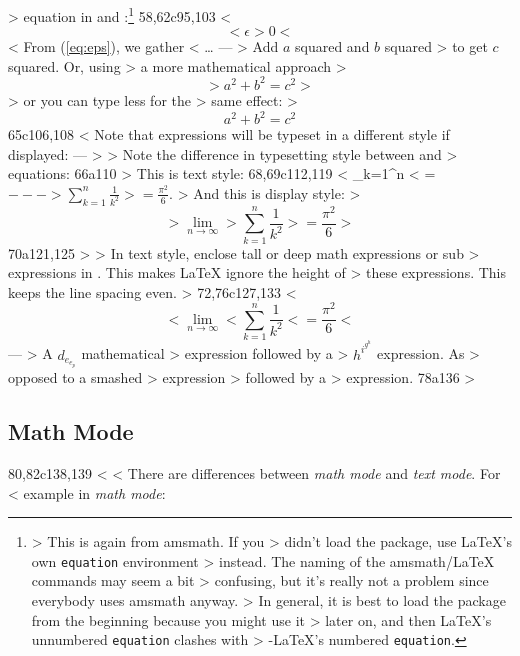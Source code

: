> equation in \ci{[} and \ci{]}:\footnote{
>   This is again from \textsf{amsmath}. If you 
> didn't load the package, use \LaTeX{}'s own \texttt{equation} environment
> instead. The naming of the \textsf{amsmath}/\LaTeX{} commands may seem a bit
> confusing, but it's really not a problem since everybody uses \textsf{amsmath} anyway.
> In general, it is best to load the package from the beginning because you might use it
> later on, and then \LaTeX's unnumbered \texttt{equation} clashes with
> \AmS-\LaTeX's numbered \texttt{equation}.}
58,62c95,103
< \begin{equation} \label{eq:eps}
< \epsilon > 0
< \end{equation}
< From (\ref{eq:eps}), we gather 
< \ldots
---
> Add $a$ squared and $b$ squared
> to get $c$ squared. Or, using
> a more mathematical approach
>  \begin{equation*}
>    a^2 + b^2 = c^2
>  \end{equation*}
> or you can type less for the
> same effect:
>  \[ a^2 + b^2 = c^2 \]
65c106,108
< Note that expressions will be typeset in a different style if displayed:
---
> 
> Note the difference in typesetting style between  and 
> equations: 
66a110
> This is text style: 
68,69c112,119
< \sum_{k=1}^n  
< = $
---
>  \sum_{k=1}^n \frac{1}{k^2} 
>  = \frac{\pi^2}{6}$.
> And this is display style:
>  \begin{equation}
>   \lim_{n \to \infty} 
>   \sum_{k=1}^n \frac{1}{k^2} 
>   = \frac{\pi^2}{6}
>  \end{equation}
70a121,125
> 
> In text style, enclose tall or deep math expressions or sub
> expressions in . This makes \LaTeX{} ignore the height of
> these expressions. This keeps the line spacing even.
> 
72,76c127,133
< \begin{displaymath}
< \lim_{n \to \infty} 
< \sum_{k=1}^n \frac{1}{k^2} 
< = \frac{\pi^2}{6}
< \end{displaymath}
---
> A $d_{e_{e_p}}$ mathematical
> expression  followed by a
> $h^{i^{g^h}}$ expression. As
> opposed to a smashed 
>  expression 
> followed by a
>  expression.
78a136
> \subsection{Math Mode}
80,82c138,139
< 
< There are differences between \emph{math mode} and \emph{text mode}. For
< example in \emph{math mode}: 
